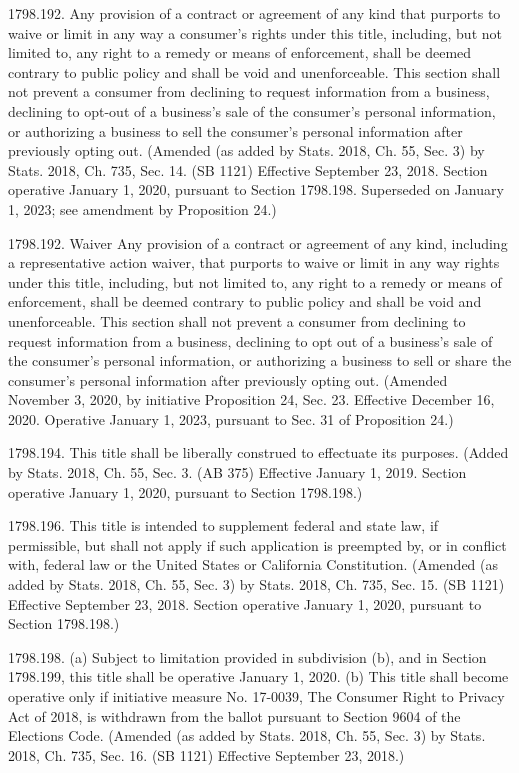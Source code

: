1798.192.  Any provision of a contract or agreement of any kind that purports to waive or limit in any way a consumer’s rights under this title, including, but not limited to, any right to a remedy or means of enforcement, shall be deemed contrary to public policy and shall be void and unenforceable. This section shall not prevent a consumer from declining to request information from a business, declining to opt-out of a business’s sale of the consumer’s personal information, or authorizing a business to sell the consumer’s personal information after previously opting out.
(Amended (as added by Stats. 2018, Ch. 55, Sec. 3) by Stats. 2018, Ch. 735, Sec. 14. (SB 1121) Effective September 23, 2018. Section operative January 1, 2020, pursuant to Section 1798.198. Superseded on January 1, 2023; see amendment by Proposition 24.)

1798.192.  Waiver
Any provision of a contract or agreement of any kind, including a representative action waiver, that purports to waive or limit in any way rights under this title, including, but not limited to, any right to a remedy or means of enforcement, shall be deemed contrary to public policy and shall be void and unenforceable. This section shall not prevent a consumer from declining to request information from a business, declining to opt out of a business’s sale of the consumer’s personal information, or authorizing a business to sell or share the consumer’s personal information after previously opting out.
(Amended November 3, 2020, by initiative Proposition 24, Sec. 23. Effective December 16, 2020. Operative January 1, 2023, pursuant to Sec. 31 of Proposition 24.)

1798.194.  This title shall be liberally construed to effectuate its purposes.
(Added by Stats. 2018, Ch. 55, Sec. 3. (AB 375) Effective January 1, 2019. Section operative January 1, 2020, pursuant to Section 1798.198.)

1798.196.  This title is intended to supplement federal and state law, if permissible, but shall not apply if such application is preempted by, or in conflict with, federal law or the United States or California Constitution.
(Amended (as added by Stats. 2018, Ch. 55, Sec. 3) by Stats. 2018, Ch. 735, Sec. 15. (SB 1121) Effective September 23, 2018. Section operative January 1, 2020, pursuant to Section 1798.198.)

1798.198.  (a) Subject to limitation provided in subdivision (b), and in Section 1798.199, this title shall be operative January 1, 2020.
(b) This title shall become operative only if initiative measure No. 17-0039, The Consumer Right to Privacy Act of 2018, is withdrawn from the ballot pursuant to Section 9604 of the Elections Code.
(Amended (as added by Stats. 2018, Ch. 55, Sec. 3) by Stats. 2018, Ch. 735, Sec. 16. (SB 1121) Effective September 23, 2018.)

